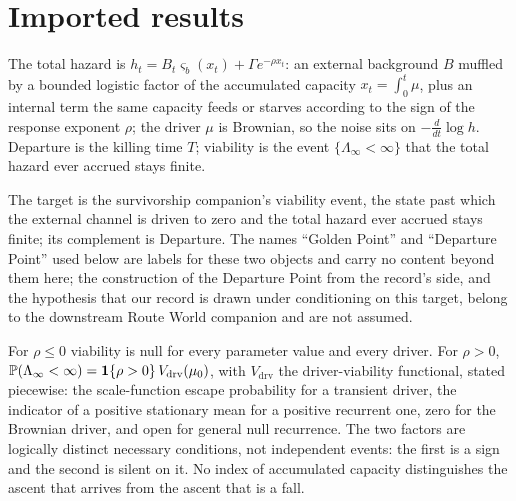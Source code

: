\section{Imported results}\label{sec:imports}

\begin{definition}\label{imp:model}
The total hazard is $h_t=B_t\varsigma_b(x_t)+\Gamma e^{-\rho x_t}$: an
external background $B$ muffled by a bounded logistic factor of the
accumulated capacity $x_t=\int_0^t\mu$, plus an internal term the same
capacity feeds or starves according to the sign of the response exponent
$\rho$; the driver $\mu$ is Brownian, so the noise sits on
$-\frac{d}{dt}\log h$. Departure is the killing time $T$; viability is
the event $\{\Lambda_\infty<\infty\}$ that the total hazard ever accrued
stays finite.
\end{definition}

\begin{definition}\label{imp:goldenpoint}
The target is the survivorship companion's viability event, the state
past which the external channel is driven to zero and the total hazard
ever accrued stays finite; its complement is Departure. The names
``Golden Point'' and ``Departure Point'' used below are labels for these
two objects and carry no content beyond them here; the construction of
the Departure Point from the record's side, and the hypothesis that our
record is drawn under conditioning on this target, belong to the
downstream Route World companion and are not assumed.
\end{definition}

\begin{theorem}
\label{imp:twocond}
For $\rho\le0$ viability is null for every parameter value and every
driver. For $\rho>0$,
$\mathbb{P}(\Lambda_\infty<\infty)=\mathbf{1}\{\rho>0\}\,V_{\mathrm{drv}}(\mu_0)$, with
$V_{\mathrm{drv}}$ the driver-viability functional, stated piecewise:
the scale-function escape probability for a transient driver, the
indicator of a positive stationary mean for a positive recurrent one,
zero for the Brownian driver, and open for general null recurrence. The
two factors are logically distinct necessary conditions, not independent
events: the first is a sign and the second is silent on it. No index of
accumulated capacity distinguishes the ascent that arrives from the
ascent that is a fall.
\end{theorem}

